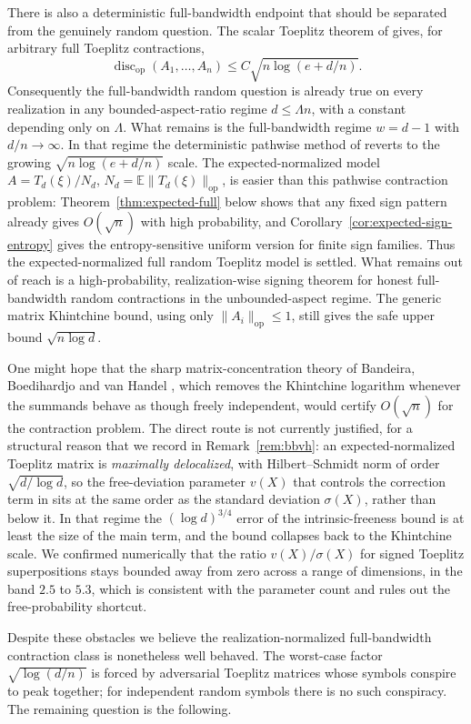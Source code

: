 \documentclass[11pt]{amsart}
\numberwithin{equation}{section}
\theoremstyle{definition}
\theoremstyle{remark}
\newcommand{\op}{\mathrm{op}}
\newcommand{\discop}{\operatorname{disc}_{\op}}
\newcommand{\Exp}{\mathbb E}
\begin{document}
There is also a deterministic full-bandwidth endpoint that should be separated
from the genuinely random question.  The scalar Toeplitz theorem of
\cite{Shmalo-paper12} gives, for arbitrary full Toeplitz contractions,
\[
\discop(A_1,\ldots,A_n)\le C\sqrt{n\log(e+d/n)}.
\]
Consequently the full-bandwidth random question is already true on every
realization in any bounded-aspect-ratio regime \(d\le \Lambda n\), with a
constant depending only on \(\Lambda\).  What remains is the full-bandwidth
regime \(w=d-1\) with \(d/n\to\infty\).  In that regime the deterministic
pathwise method of \cite{Shmalo-paper12} reverts to the growing
\(\sqrt{n\log(e+d/n)}\) scale.  The expected-normalized model
\(A=T_d(\xi)/N_d\), \(N_d=\Exp\|T_d(\xi)\|_{\op}\), is easier than this pathwise
contraction problem: Theorem~\ref{thm:expected-full} below shows that any fixed
sign pattern already gives \(O(\sqrt n)\) with high probability, and
Corollary~\ref{cor:expected-sign-entropy} gives the entropy-sensitive uniform
version for finite sign families. Thus the expected-normalized full random
Toeplitz model is settled. What remains out of
reach is a high-probability, realization-wise signing theorem for honest
full-bandwidth random contractions in the unbounded-aspect regime. The generic
matrix Khintchine bound, using only \(\|A_i\|_{\op}\le1\), still gives the safe
upper bound \(\sqrt{n\log d}\).

One might hope that the sharp matrix-concentration theory of Bandeira,
Boedihardjo and van Handel \cite{BBvH}, which removes the Khintchine logarithm
whenever the summands behave as though freely independent, would certify
\(O(\sqrt n)\) for the contraction problem.  The direct route is not currently
justified, for a structural reason that we record in Remark~\ref{rem:bbvh}: an
expected-normalized Toeplitz matrix
is \emph{maximally delocalized}, with Hilbert--Schmidt norm of order
$\sqrt{d/\log d}$, so the free-deviation parameter $v(X)$ that controls the
correction term in \cite{BBvH} sits at the same order as the standard deviation
$\sigma(X)$, rather than below it. In that regime the $(\log d)^{3/4}$ error of
the intrinsic-freeness bound is at least the size of the main term, and the bound
collapses back to the Khintchine scale. We confirmed numerically that the ratio
$v(X)/\sigma(X)$ for signed Toeplitz superpositions stays bounded away from zero
across a range of dimensions, in the band $2.5$ to $5.3$, which is consistent
with the parameter count and rules out the free-probability shortcut.

Despite these obstacles we believe the realization-normalized full-bandwidth
contraction class is nonetheless well behaved. The worst-case factor
$\sqrt{\log(d/n)}$ is forced by adversarial Toeplitz matrices whose symbols
conspire to peak together; for independent random symbols there is no such
conspiracy. The remaining question is the following.
\end{document}
